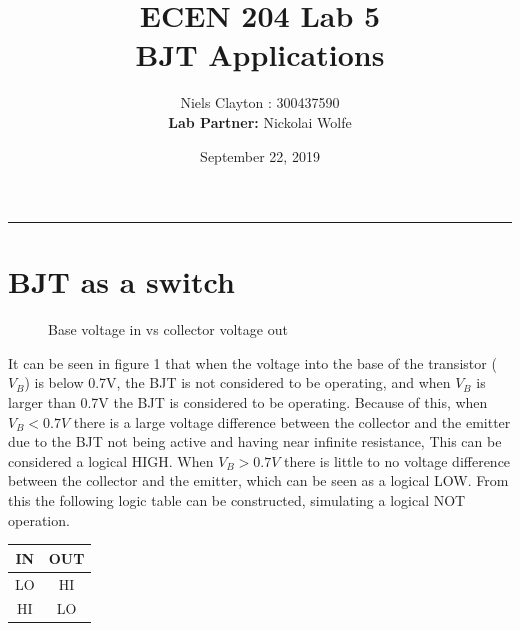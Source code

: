 \documentclass[a4paper,11pt]{article}
\begin{document}
\title{\LARGE{\textbf{ECEN 204 Lab 5}\\BJT Applications}}
\author{Niels Clayton : 300437590\\ \textbf{Lab Partner: }Nickolai Wolfe}
\date{September 22, 2019}
\maketitle
\hrule

\section{BJT as a switch}
\begin{figure}[h]
 \begin{center}
  \vspace{-8pt}
  \caption{Base voltage in vs collector voltage out}
 \end{center}
\end{figure}

It can be seen in figure 1 that when the voltage into the base of the transistor ($V_B$) is below 0.7V, the BJT is not considered to be operating, and when $V_B$ is larger than 0.7V the BJT is considered to be operating. Because of this, when $V_B < 0.7V$ there is a large voltage difference between the collector and the emitter due to the BJT not being active and having near infinite resistance, This can be considered a logical HIGH. When $V_B > 0.7V$ there is little to no voltage difference between the collector and the emitter, which can be seen as a logical LOW. From this the following logic table can be constructed, simulating a logical NOT operation.

\begin{center}
\begin{tabular}{|c|c|}  
\hline
 IN & OUT\\
\hline
LO & HI \\
HI & LO\\
\hline
\end{tabular}
\end{center}
\pagebreak
\end{document}
